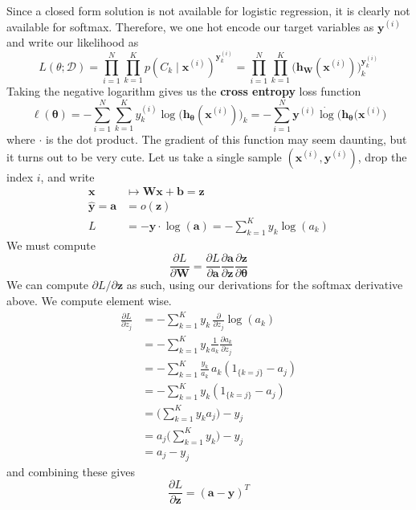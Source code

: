 \documentclass{article}
\theoremstyle{definition}
\begin{document}
  Since a closed form solution is not available for logistic regression, it is clearly not available for softmax. Therefore, we one hot encode our target variables as $\mathbf{y}^{(i)}$ and write our likelihood as 
  \[L(\theta; \mathcal{D}) = \prod_{i=1}^N \prod_{k=1}^K p(C_k \mid \mathbf{x}^{(i)})^{\mathbf{y}^{(i)}_k} = \prod_{i=1}^N \prod_{k=1}^K \big( \mathbf{h}_\mathbf{W} (\mathbf{x}^{(i)})\big)_k^{\mathbf{y}_k^{(i)}} \]
  Taking the negative logarithm gives us the \textbf{cross entropy} loss function
  \[\ell (\boldsymbol{\theta}) = - \sum_{i=1}^N \sum_{k=1}^K y^{(i)}_k \log \big( \mathbf{h}_{\boldsymbol{\theta}} (\mathbf{x}^{(i)})\big)_k = - \sum_{i=1}^N \mathbf{y}^{(i)} \dot \log \big( \mathbf{h}_{\boldsymbol{\theta}} (\mathbf{x}^{(i)} \big) \]
  where $\cdot$ is the dot product. The gradient of this function may seem daunting, but it turns out to be very cute. Let us take a single sample $(\mathbf{x}^{(i)}, \mathbf{y}^{(i)})$, drop the index $i$, and write
  \begin{align*}
      \mathbf{x} & \mapsto \mathbf{W} \mathbf{x} + \mathbf{b} = \mathbf{z} \\
      \hat{\mathbf{y}} = \mathbf{a} & = o (\mathbf{z}) \\
      L & = - \mathbf{y} \cdot \log (\mathbf{a}) = - \sum_{k=1}^K y_k \log(a_k)
  \end{align*}
  We must compute 
  \[\frac{\partial L}{\partial \mathbf{W}} = \frac{\partial L}{\partial \mathbf{a}} \frac{\partial \mathbf{a}}{\partial \mathbf{z}} \frac{\partial \mathbf{z}}{\partial \boldsymbol{\theta}}\]
  We can compute $\partial L /\partial \mathbf{z}$ as such, using our derivations for the softmax derivative above. We compute element wise. 
  \begin{align*}
      \frac{\partial L}{\partial z_j} & = - \sum_{k=1}^K y_k \, \frac{\partial}{\partial z_j} \log (a_k) \\
      & = - \sum_{k=1}^K y_k \frac{1}{a_k} \frac{\partial a_k}{\partial z_j} \\
      & = - \sum_{k=1}^K \frac{y_k}{a_k} \, a_k (1_{\{k = j\}} - a_j) \\
      & = - \sum_{k=1}^K y_k (1_{\{k = j\}} - a_j) \\
      & = \bigg( \sum_{k=1}^K y_k a_j \bigg) - y_j \\
      & = a_j \bigg( \sum_{k=1}^K y_k \bigg) - y_j \\
      & = a_j - y_j
  \end{align*}
  and combining these gives 
  \[\frac{\partial L}{\partial \mathbf{z}} = (\mathbf{a} - \mathbf{y})^T\]
\end{document}
